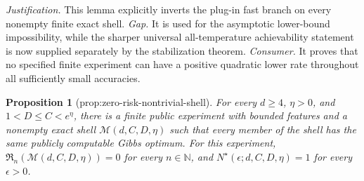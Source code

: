 \documentclass{article}
\newtheorem{proposition}{Proposition}
\begin{document}
\par\smallskip\noindent \textit{Justification.} This lemma explicitly inverts the plug-in fast branch on every nonempty finite exact shell. \textit{Gap.} It is used for the asymptotic lower-bound impossibility, while the sharper universal all-temperature achievability statement is now supplied separately by the stabilization theorem. \textit{Consumer.} It proves that no specified finite experiment can have a positive quadratic lower rate throughout all sufficiently small accuracies.

\begin{proposition}[prop:zero-risk-nontrivial-shell]\label{prop:zero-risk-nontrivial-shell}
For every \(d\ge4\), \(\eta>0\), and \(1<D\le C<e^\eta\), there is a finite public experiment with bounded features and a nonempty exact shell \(\mathcal M(d,C,D,\eta)\) such that every member of the shell has the same publicly computable Gibbs optimum. For this experiment, \(\mathfrak R_n(\mathcal M(d,C,D,\eta))=0\) for every \(n\in\mathbb N\), and \(N^\star(\epsilon;d,C,D,\eta)=1\) for every \(\epsilon>0\).
\end{proposition}
\end{document}
